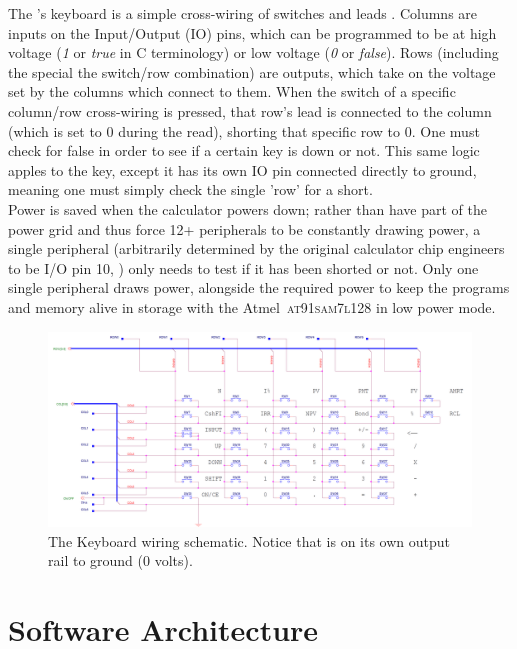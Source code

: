 \documentclass{LibHP20b}
\begin{document}
The \HP[]'s keyboard is a simple cross-wiring of switches and leads  . Columns are inputs on the Input/Output (IO) pins, which can be programmed to be at high voltage (\emph{1} or \emph{true} in C terminology) or low voltage (\emph{0} or \emph{false}). Rows (including the special the  switch/row combination) are outputs, which take on the voltage set by the columns which connect to them. When the switch of a specific column/row cross-wiring is pressed, that row's lead is connected to the column (which is set to 0 during the read), shorting that specific row to 0. One must check for false in order to see if a certain key is down or not. This same logic apples to the  key, except it has its own IO pin connected directly to ground, meaning one must simply check the single 'row' for a short.\\
Power is saved when the calculator powers down; rather than have  part of the power grid and thus force 12+ peripherals to be constantly drawing power, a single peripheral (arbitrarily determined by the original calculator chip engineers to be I/O pin 10, ) only needs to test if it has been shorted or not. Only one single peripheral draws power, alongside the required power to keep the programs and memory alive in storage with the Atmel~\textsc{at91sam7l128} in low power mode.

\begin{figure}
\centerline{\includegraphics[height=0.4\textheight]{HP20bKeyboardSchematic.png}}
\caption{The \HP[hp] Keyboard wiring schematic. Notice that  is on its own output rail to ground (0 volts).}
\label{fig:hp20bkeyboard}
\end{figure}

\section{Software Architecture}
\end{document}

